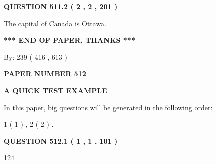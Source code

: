 \documentclass[12pt]{article}
\begin{document}
{\textbf{\Large{QUESTION
511.2 
 ( 2 , 2 , 201 )
}}}
  
  
 
 
\noindent{}
 
 
The capital of Canada is Ottawa.
 
 
 
 
   
   
 \vspace{0.2in}
 
   
   
   
   
\vspace{1.0in} 
{\textbf{\large{ *** END OF PAPER, THANKS *** }}} 
   
   
\hspace{1.0in} By: 
 239 ( 416 ,  613 )
   
   
   
   
\newpage 
\setcounter{page}{ 
   512001 } 
   
   
   
   
 {\textbf{ \Large{ PAPER NUMBER  512  }}}
   
   
\vspace{0.2in}
   
   
   
   
   
   
 \vspace{0.2in}
{\LARGE {\textbf{ A QUICK TEST EXAMPLE}}}
   
   
   
\vspace{0.2in}
   
In this paper, big questions will be generated in the following order: 
   
   
   1 ( 1 )
 ,
   2 ( 2 )
 .
  
\vspace{0.2in}
  
{\textbf{\Large{QUESTION
512.1 
 ( 1 , 1 , 101 )
}}}
  
  
 
 
\noindent{}

124
 
 
 
 
\noindent{}
\end{document}

